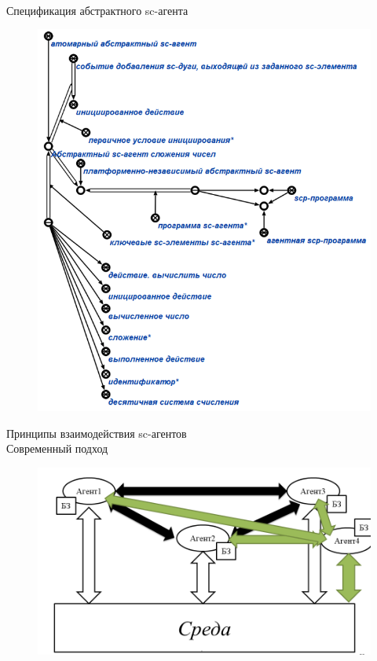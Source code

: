 \begin{frame}{\\Спецификация абстрактного sc-агента}
	\topline
	\justifying
	\vspace{3em}
	\begin{figure}[H]
		\includegraphics[scale=0.45]{./figures/sd_multiagent_processing/spec.png}
	\end{figure}
\end{frame}


\begin{frame}{Принципы взаимодействия sc-агентов\\Современный подход}
	\topline
	\justifying
	\vspace{3em}
	\begin{figure}[H]
		\includegraphics[scale=0.45]{./figures/sd_multiagent_processing/agent1.png}
	\end{figure}
\end{frame}

